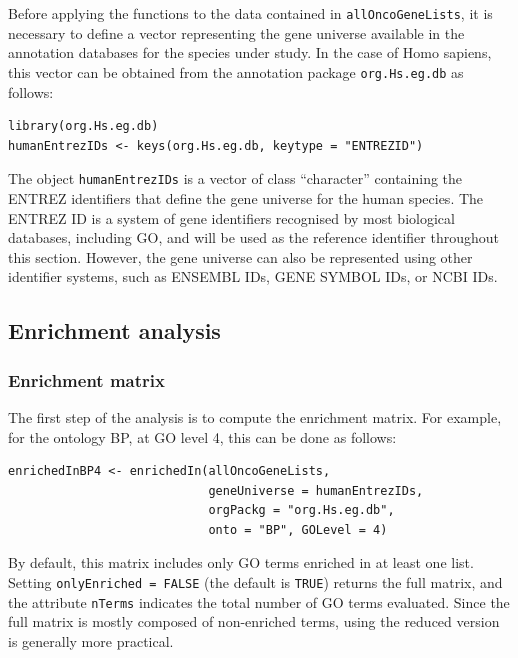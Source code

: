Before applying the  functions to the data contained in \texttt{allOncoGeneLists}, it is necessary to define a vector representing the gene universe available in the annotation databases for the species under study. In the case of Homo sapiens, this vector can be obtained from the annotation package \texttt{org.Hs.eg.db} as follows:

\begin{verbatim}
library(org.Hs.eg.db)
humanEntrezIDs <- keys(org.Hs.eg.db, keytype = "ENTREZID")
\end{verbatim}

The object \texttt{humanEntrezIDs} is a vector of class ``character'' containing the ENTREZ identifiers that define the gene universe for the human species. The ENTREZ ID is a system of gene identifiers recognised by most biological databases, including GO, and will be used as the reference identifier throughout this section. However, the gene universe can also be represented using other identifier systems, such as ENSEMBL IDs, GENE SYMBOL IDs, or NCBI IDs.

\subsection{Enrichment analysis}\label{enrichment-analysis}

\subsubsection{Enrichment matrix}\label{enrichment-matrix}

The first step of the analysis is to compute the enrichment matrix. For example, for the ontology BP, at GO level 4, this can be done as follows:

\begin{verbatim}
enrichedInBP4 <- enrichedIn(allOncoGeneLists, 
                            geneUniverse = humanEntrezIDs, 
                            orgPackg = "org.Hs.eg.db", 
                            onto = "BP", GOLevel = 4) 
\end{verbatim}

By default, this matrix includes only GO terms enriched in at least one list. Setting \texttt{onlyEnriched\ =\ FALSE} (the default is \texttt{TRUE}) returns the full matrix, and the attribute \texttt{nTerms} indicates the total number of GO terms evaluated. Since the full matrix is mostly composed of non-enriched terms, using the reduced version is generally more practical.

